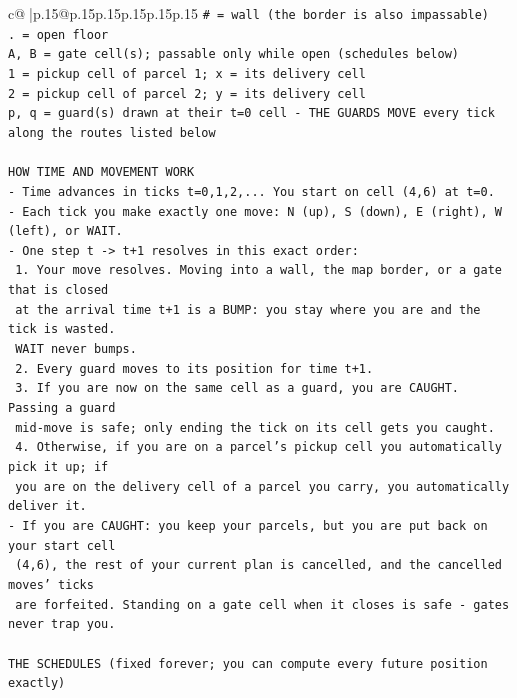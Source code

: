 \documentclass{article}
\begin{document}
{\begin{supertabular}{c@{$\;$}|p{.15\linewidth}@{}p{.15\linewidth}p{.15\linewidth}p{.15\linewidth}p{.15\linewidth}p{.15\linewidth}}
{{{\texttt{\# = wall (the border is also impassable)} \\
\texttt{. = open floor} \\
\texttt{A, B = gate cell(s); passable only while open (schedules below)} \\
\texttt{1 = pickup cell of parcel 1; x = its delivery cell} \\
\texttt{2 = pickup cell of parcel 2; y = its delivery cell} \\
\texttt{p, q = guard(s) drawn at their t=0 cell {-} THE GUARDS MOVE every tick along the routes listed below} \\
\\ 
\texttt{HOW TIME AND MOVEMENT WORK} \\
\texttt{{-} Time advances in ticks t=0,1,2,... You start on cell (4,6) at t=0.} \\
\texttt{{-} Each tick you make exactly one move: N (up), S (down), E (right), W (left), or WAIT.} \\
\texttt{{-} One step t {-}> t+1 resolves in this exact order:} \\
\texttt{  1. Your move resolves. Moving into a wall, the map border, or a gate that is closed} \\
\texttt{     at the arrival time t+1 is a BUMP: you stay where you are and the tick is wasted.} \\
\texttt{     WAIT never bumps.} \\
\texttt{  2. Every guard moves to its position for time t+1.} \\
\texttt{  3. If you are now on the same cell as a guard, you are CAUGHT. Passing a guard} \\
\texttt{     mid{-}move is safe; only ending the tick on its cell gets you caught.} \\
\texttt{  4. Otherwise, if you are on a parcel's pickup cell you automatically pick it up; if} \\
\texttt{     you are on the delivery cell of a parcel you carry, you automatically deliver it.} \\
\texttt{{-} If you are CAUGHT: you keep your parcels, but you are put back on your start cell} \\
\texttt{  (4,6), the rest of your current plan is cancelled, and the cancelled moves' ticks} \\
\texttt{  are forfeited. Standing on a gate cell when it closes is safe {-} gates never trap you.} \\
\\ 
\texttt{THE SCHEDULES (fixed forever; you can compute every future position exactly)} \\
}}}
\end{supertabular}}
\end{document}
